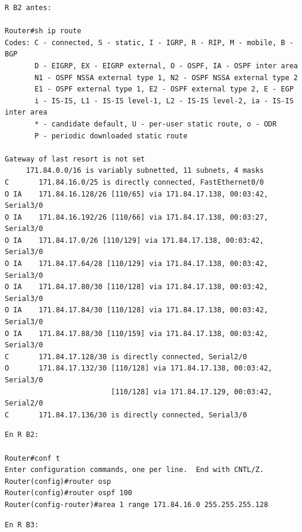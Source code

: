 \documentclass[twoside, 11pt]{article}
\begin{document}
\begin{enumerate}
\clearpage
\begin{center}
\begin{verbatim}
R B2 antes:

Router#sh ip route 
Codes: C - connected, S - static, I - IGRP, R - RIP, M - mobile, B - BGP
       D - EIGRP, EX - EIGRP external, O - OSPF, IA - OSPF inter area
       N1 - OSPF NSSA external type 1, N2 - OSPF NSSA external type 2
       E1 - OSPF external type 1, E2 - OSPF external type 2, E - EGP
       i - IS-IS, L1 - IS-IS level-1, L2 - IS-IS level-2, ia - IS-IS inter area
       * - candidate default, U - per-user static route, o - ODR
       P - periodic downloaded static route

Gateway of last resort is not set
     171.84.0.0/16 is variably subnetted, 11 subnets, 4 masks
C       171.84.16.0/25 is directly connected, FastEthernet0/0
O IA    171.84.16.128/26 [110/65] via 171.84.17.138, 00:03:42, Serial3/0
O IA    171.84.16.192/26 [110/66] via 171.84.17.138, 00:03:27, Serial3/0
O IA    171.84.17.0/26 [110/129] via 171.84.17.138, 00:03:42, Serial3/0
O IA    171.84.17.64/28 [110/129] via 171.84.17.138, 00:03:42, Serial3/0
O IA    171.84.17.80/30 [110/128] via 171.84.17.138, 00:03:42, Serial3/0
O IA    171.84.17.84/30 [110/128] via 171.84.17.138, 00:03:42, Serial3/0
O IA    171.84.17.88/30 [110/159] via 171.84.17.138, 00:03:42, Serial3/0
C       171.84.17.128/30 is directly connected, Serial2/0
O       171.84.17.132/30 [110/128] via 171.84.17.138, 00:03:42, Serial3/0
                         [110/128] via 171.84.17.129, 00:03:42, Serial2/0
C       171.84.17.136/30 is directly connected, Serial3/0
\end{verbatim}
\label{list:2.1.2.10.1}

\begin{verbatim}
En R B2:

Router#conf t
Enter configuration commands, one per line.  End with CNTL/Z.
Router(config)#router osp
Router(config)#router ospf 100
Router(config-router)#area 1 range 171.84.16.0 255.255.255.128
\end{verbatim}
\label{list:2.1.2.10.2}

\begin{verbatim}
En R B3:


\end{verbatim}
\end{center}
\end{enumerate}
\end{document}
